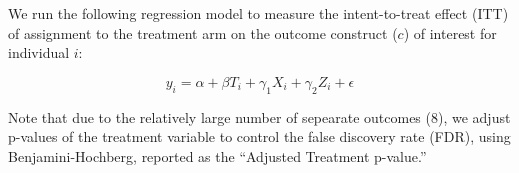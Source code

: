 \message{ !name(bebbo.tex)}\documentclass{article}
\begin{document}
We run the following regression model to measure the intent-to-treat effect (ITT) of assignment to the treatment arm on the outcome construct ($c$) of interest for individual $i$:

$$
y_{i} = \alpha + \beta T_{i} + \gamma_1X_{i} + \gamma_2Z_i + \epsilon
$$

Note that due to the relatively large number of sepearate outcomes (8), we adjust p-values of the treatment variable to control the false discovery rate (FDR), using Benjamini-Hochberg, reported as the ``Adjusted Treatment p-value.''




% 
% 
% 

% 
% 
% 









% 
% 
% 

% 
% 
% 
\end{document}
